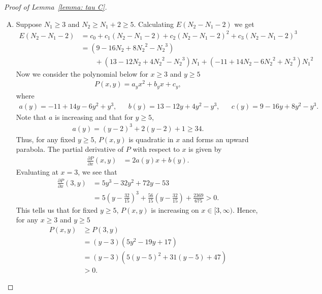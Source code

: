 \documentclass{ws-ijnt}
\begin{document}
\begin{proof}[Proof of Lemma~\ref{lemma: tau C}]
\begin{enumerate}[A.]
			\item 
			Suppose $N_1\geq3$ and $N_2\geq N_1+2\geq5$. Calculating $E(N_2-N_1-2)$ we get
			{
				\begin{align*}
					E(N_2-N_1-2)
					&=c_0+c_1(N_2-N_1-2)+c_2(N_2-N_1-2)^2+c_3(N_2-N_1-2)^3 \\
					&=(9-16{N_2}+8{N_2}^2-{N_2}^3)\\
					&\qquad+(13-12{N_2}+4{N_2}^2-{N_2}^3){N_1}+(-11+14{N_2}-6{N_2}^2+{N_2}^3){N_1}^2
				\end{align*}
			}
			Now we consider the polynomial below for $x\geq3$ and $y\geq5$ 
			\begin{align*}
				P(x, y) = a_y x^2+b_y x+c_y,
			\end{align*}
			where
			\begin{align*}
				a(y) = -11+14y-6y^2+y^3, &&
				b(y) = 13-12y+4y^2-y^3, &&
				c(y) = 9-16y+8y^2-y^3.
			\end{align*}
			Note that $a$ is increasing and that for $y\geq5$,
			\begin{align*}
				a(y)=(y-2)^3+2(y-2)+1\geq34.
			\end{align*}
			Thus, for any fixed $y\geq5$, $P(x, y)$ is quadratic in $x $ and forms an upward parabola. The partial derivative of $P$ with respect to $x$ is given by
			\begin{align*}
				\frac{\partial P}{\partial x}(x,y)&=2a(y)x+b(y).
			\end{align*}
			Evaluating at $x=3$, we see that
			\begin{align*}
				\frac{\partial P}{\partial x}(3,y)
				&=5y^3-32y^2+72y-53 \\
				&=5\left(y-\frac{32}{15}\right)^3+\frac{56}{15}\left(y-\frac{32}{15}\right)+\frac{2369}{675}>0.
			\end{align*}
			This tells us that for fixed $y\geq 5$, $P(x,y)$ is increasing on $x\in[3,\infty)$. Hence, for any $x\geq3$ and $y\geq5$
			\begin{align*}
				P(x,y)
				&\geq P(3,y) \\
				&=(y-3) (5 y^2-19 y+17) \\
				&=(y-3)\left(5 (y-5)^2+31 (y-5)+47\right) \\
				&>0.
			\end{align*}
			
		\end{enumerate}
	\end{proof}
	
\end{document}
